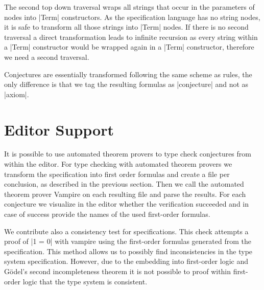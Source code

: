 The second top down traversal wraps all strings that occur in the
parameters of nodes into \code|Term| constructors. As the
specification language has no string nodes, it is safe to transform
all those strings into \code|Term| nodes. If there is no second
traversal a direct transformation leads to infinite recursion as every
string within a \code|Term| constructor would be wrapped again in a
\code|Term| constructor, therefore we need a second traversal.

Conjectures are essentially transformed following the same scheme as
rules, the only difference is that we tag the resulting formulas as
\code|conjecture| and not as \code|axiom|.

\section{Editor Support}
It is possible to use automated theorem provers to type check
conjectures from within the editor. For type checking with automated
theorem provers we transform the specification into first order
formulas and create a file per conclusion, as described in the
previous section. Then we call the automated theorem prover Vampire on
each resulting file and parse the results. For each conjecture we
visualize in the editor whether the verification succeeded and in case
of success provide the names of the used first-order formulas.

We contribute also a consistency test for specifications. This check
attempts a proof of \code|1 = 0| with vampire using the first-order
formulas generated from the specification. This method allows us to
possibly find inconsistencies in the type system
specification. However, due to the embedding into first-order logic
and Gödel's second incompleteness theorem it is not possible to proof
within first-order logic that the type system is consistent.

